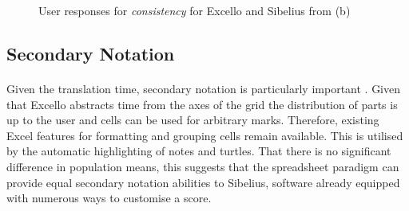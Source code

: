 \begin{figure}[htb]
\caption{User responses for \textit{consistency} for Excello and Sibelius from (b)}
\label{evaluation:cons}
\end{figure}

\subsection{Secondary Notation}

\paragraph{} Given the translation time, secondary notation is particularly important \cite{blackwell:notation}. Given that Excello abstracts time from the axes of the grid the distribution of parts is up to the user and cells can be used for arbitrary marks. Therefore, existing Excel features for formatting and grouping cells remain available. This is utilised by the automatic highlighting of notes and turtles. That there is no significant difference in population means, this suggests that the spreadsheet paradigm can provide equal secondary notation abilities to Sibelius, software already equipped with numerous ways to customise a score.


